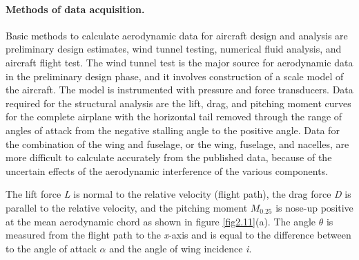 \documentclass{AeroStructure-ERJohnson}
\begin{document}
\vspace*{-10pt}

\paragraph{Methods of data acquisition.}

Basic methods to calculate aerodynamic data for aircraft design and analysis are preliminary design estimates, wind tunnel testing, numerical fluid analysis, and aircraft flight test. The wind tunnel test is the major source for aerodynamic data in the preliminary design phase, and it involves construction of a scale model of the aircraft. The model is instrumented with pressure and force transducers. Data required for the structural analysis are the lift, drag, and pitching moment curves for the complete airplane with the horizontal tail removed through the range of angles of attack from the negative stalling angle to the positive angle. Data for the combination of the wing and fuselage, or the wing, fuselage, and nacelles, are more difficult to calculate accurately from the published data, because of the uncertain effects of the aerodynamic interference of the various components.

The lift force \textit{L} is normal to the relative velocity (flight path), the drag force \textit{D} is parallel to the relative velocity, and the pitching moment $M_{0.25}$ is nose-up positive at the mean aerodynamic chord as shown in figure \ref{fig2.11}(a). The angle $\theta$ is measured from the flight path to the \textit{x}-axis and is equal to the difference between to the angle of attack $\alpha$ and the angle of wing incidence \textit{i}.

{\def\thefigure{2.11}
}

\vspace*{10pt}

\pagebreak
\end{document}
